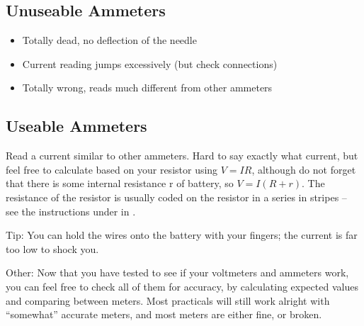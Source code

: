 \subsection{Unuseable Ammeters} 	
\begin{itemize}
\item{Totally dead, 
no deflection of the needle}
\item{Current reading jumps excessively (but check connections)}
\item{Totally wrong, 
reads much different from other ammeters}
\end{itemize}

\subsection{Useable Ammeters}
Read a current similar to other ammeters. 
Hard to say exactly what current, 
but feel free to calculate based on your resistor using $ V=IR $, 
although do not forget that there is 
some internal resistance r of battery, 
so $ V=I(R+r) $. 
The resistance of the resistor is usually coded 
on the resistor in a series in stripes -- 
see the instructions under  in .

Tip: You can hold the wires onto the battery with your fingers; 
the current is far too low to shock you.

Other: Now that you have tested to see 
if your voltmeters and ammeters work, 
you can feel free to check all of them for accuracy, 
by calculating expected values and comparing between meters. 
Most practicals will still work alright with ``somewhat'' accurate meters, 
and most meters are either fine, 
or broken.
